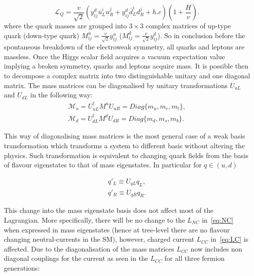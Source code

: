 \begin{equation}
	\mathcal{L}_{Q}=\frac{v}{\sqrt{2}}(y^{d}_{ij}\overline{u}^{i}_{L} u^{j}_{R} + {y}_{ij}^{d}\overline{d}^{i}_{L} d^{j}_{R} + h.c)(1+\frac{H}{v}).
	\label{eq:SSB4}
\end{equation}
where the quark masses are grouped into $3\times3$ complex matrices of up-type quark (down-type quark) $M^{u}_{ij}=\frac{v}{\sqrt{2}}y_{ij}^{u}$ ($M^{d}_{ij}=\frac{v}{\sqrt{2}}y_{ij}^{d}$).
So in conclusion before the spontaneous breakdown of the electroweak symmetry, all quarks and leptons are massless. Once the Higgs scalar field acquires a vacuum expectation value implying a broken symmetry, quarks and leptons acquire mass. It is possible then to decompose a complex matrix into two distinguishable unitary and one diagonal matrix. The mass matrices can be diagonalised by unitary transformations $U_{uL}$ and $ U_{dL}$ in the following way:
\begin{equation}
\begin{split}
	\mathcal{M}_{u} = U^{\dagger}_{uL}M^{u}U_{uR} = Diag\{m_{u},m_{c},m_{t}\},
\\
	\mathcal{M}_{d} = U^{\dagger}_{dL}M^{d}U_{dR} = Diag\{m_{d},m_{s},m_{b}\}.
\end{split}
	\label{eq:unit}
\end{equation}

This way of diagonalising mass matrices is the most general case of a weak basis transformation which transforms a system to different basis without altering the physics. Such transformation is equivalent to changing quark fields from the basis of flavour eigenstates to that of mass eigenstates.
In particular for $q\in(u,d)$

\begin{equation}
\begin{split}
q'_{L} \equiv U_{qL} q_{L},
\\
q'_{R} \equiv U_{qR} q_{R}.
\end{split}
\end{equation}

This change into the mass eigenstate basis does not affect most of the Lagrangian. More specifically, there will be no change to the $L_{NC}$ in~\autoref{eq:NC} when expressed in mass eigenstates (hence at tree-level there are no flavour changing neutral-currents in the \gls{SM}), however, charged current $L_{CC}$ in~\autoref{eq:LC} is affected. Due to the diagonalisation of the mass matrices $L_{CC}$ now includes non diagonal couplings for the current as seen in the $L_{CC}$ for all three fermion generations:

